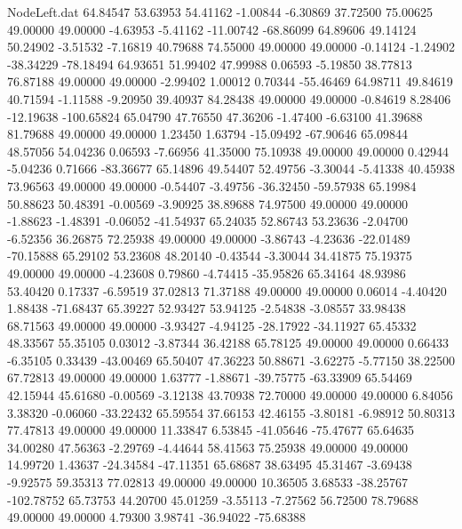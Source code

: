 \begin{filecontents}{NodeLeft.dat}
  64.84547   53.63953   54.41162    -1.00844   -6.30869   37.72500   75.00625   49.00000   49.00000   -4.63953   -5.41162  -11.00742  -68.86099
  64.89606   49.14124   50.24902    -3.51532   -7.16819   40.79688   74.55000   49.00000   49.00000   -0.14124   -1.24902  -38.34229  -78.18494
  64.93651   51.99402   47.99988     0.06593   -5.19850   38.77813   76.87188   49.00000   49.00000   -2.99402    1.00012    0.70344  -55.46469
  64.98711   49.84619   40.71594    -1.11588   -9.20950   39.40937   84.28438   49.00000   49.00000   -0.84619    8.28406  -12.19638 -100.65824
  65.04790   47.76550   47.36206    -1.47400   -6.63100   41.39688   81.79688   49.00000   49.00000    1.23450    1.63794  -15.09492  -67.90646
  65.09844   48.57056   54.04236     0.06593   -7.66956   41.35000   75.10938   49.00000   49.00000    0.42944   -5.04236    0.71666  -83.36677
  65.14896   49.54407   52.49756    -3.30044   -5.41338   40.45938   73.96563   49.00000   49.00000   -0.54407   -3.49756  -36.32450  -59.57938
  65.19984   50.88623   50.48391    -0.00569   -3.90925   38.89688   74.97500   49.00000   49.00000   -1.88623   -1.48391   -0.06052  -41.54937
  65.24035   52.86743   53.23636    -2.04700   -6.52356   36.26875   72.25938   49.00000   49.00000   -3.86743   -4.23636  -22.01489  -70.15888
  65.29102   53.23608   48.20140    -0.43544   -3.30044   34.41875   75.19375   49.00000   49.00000   -4.23608    0.79860   -4.74415  -35.95826
  65.34164   48.93986   53.40420     0.17337   -6.59519   37.02813   71.37188   49.00000   49.00000    0.06014   -4.40420    1.88438  -71.68437
  65.39227   52.93427   53.94125    -2.54838   -3.08557   33.98438   68.71563   49.00000   49.00000   -3.93427   -4.94125  -28.17922  -34.11927
  65.45332   48.33567   55.35105     0.03012   -3.87344   36.42188   65.78125   49.00000   49.00000    0.66433   -6.35105    0.33439  -43.00469
  65.50407   47.36223   50.88671    -3.62275   -5.77150   38.22500   67.72813   49.00000   49.00000    1.63777   -1.88671  -39.75775  -63.33909
  65.54469   42.15944   45.61680    -0.00569   -3.12138   43.70938   72.70000   49.00000   49.00000    6.84056    3.38320   -0.06060  -33.22432
  65.59554   37.66153   42.46155    -3.80181   -6.98912   50.80313   77.47813   49.00000   49.00000   11.33847    6.53845  -41.05646  -75.47677
  65.64635   34.00280   47.56363    -2.29769   -4.44644   58.41563   75.25938   49.00000   49.00000   14.99720    1.43637  -24.34584  -47.11351
  65.68687   38.63495   45.31467    -3.69438   -9.92575   59.35313   77.02813   49.00000   49.00000   10.36505    3.68533  -38.25767 -102.78752
  65.73753   44.20700   45.01259    -3.55113   -7.27562   56.72500   78.79688   49.00000   49.00000    4.79300    3.98741  -36.94022  -75.68388

\end{filecontents}
